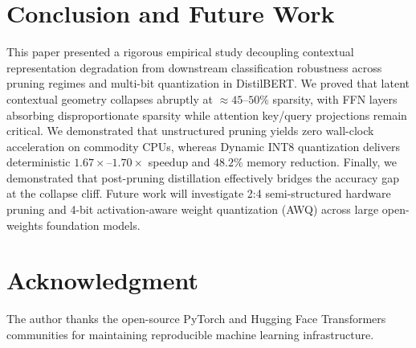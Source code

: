 \documentclass[conference]{IEEEtran}
\begin{document}
\section{Conclusion and Future Work}
This paper presented a rigorous empirical study decoupling contextual representation degradation from downstream classification robustness across pruning regimes and multi-bit quantization in DistilBERT. We proved that latent contextual geometry collapses abruptly at $\approx 45\text{--}50\%$ sparsity, with FFN layers absorbing disproportionate sparsity while attention key/query projections remain critical. We demonstrated that unstructured pruning yields zero wall-clock acceleration on commodity CPUs, whereas Dynamic INT8 quantization delivers deterministic $1.67\times\text{--}1.70\times$ speedup and $48.2\%$ memory reduction. Finally, we demonstrated that post-pruning distillation effectively bridges the accuracy gap at the collapse cliff. Future work will investigate 2:4 semi-structured hardware pruning and 4-bit activation-aware weight quantization (AWQ) across large open-weights foundation models.

\section*{Acknowledgment}
The author thanks the open-source PyTorch and Hugging Face Transformers communities for maintaining reproducible machine learning infrastructure.



\end{document}
